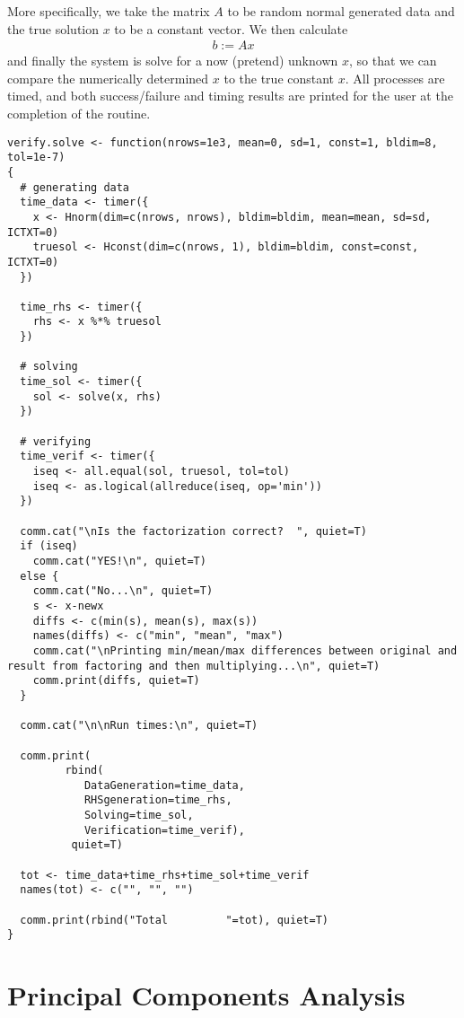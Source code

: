 More specifically, we take the matrix $A$ to be random normal generated data and the true solution $x$ to be a constant vector.  We then calculate
\begin{align*}
b := Ax
\end{align*}
and finally the system is solve for a now (pretend) unknown $x$, so that we can compare the numerically determined $x$ to the true constant $x$.  All processes are timed, and both success/failure and timing results are printed for the user at the completion of the routine. 

\begin{lstlisting}[language=rr,title=Verifying Distributed System Solving]
verify.solve <- function(nrows=1e3, mean=0, sd=1, const=1, bldim=8, tol=1e-7)
{
  # generating data
  time_data <- timer({
    x <- Hnorm(dim=c(nrows, nrows), bldim=bldim, mean=mean, sd=sd, ICTXT=0)
    truesol <- Hconst(dim=c(nrows, 1), bldim=bldim, const=const, ICTXT=0)
  })
  
  time_rhs <- timer({
    rhs <- x %*% truesol
  })

  # solving
  time_sol <- timer({
    sol <- solve(x, rhs)
  })
  
  # verifying
  time_verif <- timer({
    iseq <- all.equal(sol, truesol, tol=tol)
    iseq <- as.logical(allreduce(iseq, op='min'))
  })
  
  comm.cat("\nIs the factorization correct?  ", quiet=T)
  if (iseq)
    comm.cat("YES!\n", quiet=T)
  else {
    comm.cat("No...\n", quiet=T)
    s <- x-newx
    diffs <- c(min(s), mean(s), max(s))
    names(diffs) <- c("min", "mean", "max")
    comm.cat("\nPrinting min/mean/max differences between original and result from factoring and then multiplying...\n", quiet=T)
    comm.print(diffs, quiet=T)
  }
  
  comm.cat("\n\nRun times:\n", quiet=T)
  
  comm.print( 
         rbind(
            DataGeneration=time_data, 
            RHSgeneration=time_rhs,
            Solving=time_sol, 
            Verification=time_verif),
          quiet=T)
  
  tot <- time_data+time_rhs+time_sol+time_verif
  names(tot) <- c("", "", "")
  
  comm.print(rbind("Total         "=tot), quiet=T)
}
\end{lstlisting}








\section{Principal Components Analysis}

